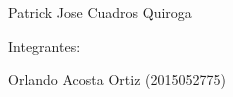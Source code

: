 \documentclass[12pt,letterpaper]{article}
\begin{document}
\begin{titlepage}
\begin{center}
\vspace*{0.1in}
\begin{large}
 Patrick Jose Cuadros Quiroga\\
\end{large}

\vspace*{0.2in}
\vspace*{0.1in}
\begin{large}
Integrantes: \\
\begin{flushleft}



Orlando Acosta Ortiz                               \hfill	(2015052775) \\   

 

\end{flushleft}
\end{large}
\end{center}

\end{titlepage}


\end{document}
